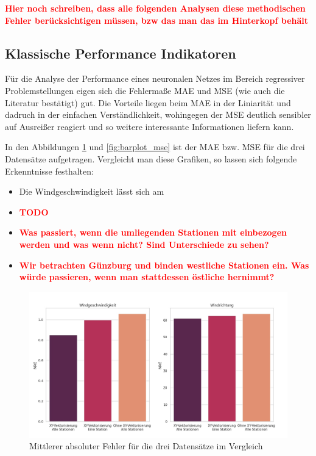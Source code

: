 \documentclass[
12pt, %
toc=listofnumbered, %
toc=chapterentrydotfill, %
numbers=noenddot, %
captions=tableheading, %
bibliography=numbered
]{scrreprt}
\let\Oldsubsection\subsection
\renewcommand{\subsection}{\FloatBarrier\Oldsubsection}
\newcommand{\highlight}[1]{\textbf{\textcolor{red}{#1}}}
\begin{document}
\highlight{Hier noch schreiben, dass alle folgenden Analysen diese methodischen Fehler berücksichtigen müssen, bzw das man das im Hinterkopf behält}

\subsection{Klassische Performance Indikatoren}
Für die Analyse der Performance eines neuronalen Netzes im Bereich regressiver Problemstellungen eigen sich die Fehlermaße MAE und MSE (wie auch die Literatur bestätigt) gut. Die Vorteile liegen beim MAE in der Liniarität und dadruch in der einfachen Verständlichkeit, wohingegen der MSE deutlich sensibler auf Ausreißer reagiert und so weitere interessante Informationen liefern kann.

In den Abbildungen \ref{fig:barplot_mae} und \ref{fig:barplot_mse} ist der MAE bzw. MSE für die drei Datensätze aufgetragen. Vergleicht man diese Grafiken, so lassen sich folgende Erkenntnisse festhalten:

\begin{itemize}
	\item Die Windgeschwindigkeit lässt sich am 
	\item \highlight{TODO}
	\item \highlight{Was passiert, wenn die umliegenden Stationen mit einbezogen werden und was wenn nicht? Sind Unterschiede zu sehen?}

	\item\highlight{Wir betrachten Günzburg und binden westliche Stationen ein. Was würde passieren, wenn man stattdessen östliche hernimmt?}
\end{itemize}

\begin{figure}[tph]
	\begin{center}
		\includegraphics[width=\linewidth]{./images/barplot_mae-cropped.jpg}
		\caption{Mittlerer absoluter Fehler für die drei Datensätze im Vergleich}
		\label{fig:barplot_mae}
	\end{center}
\end{figure}
\end{document}
